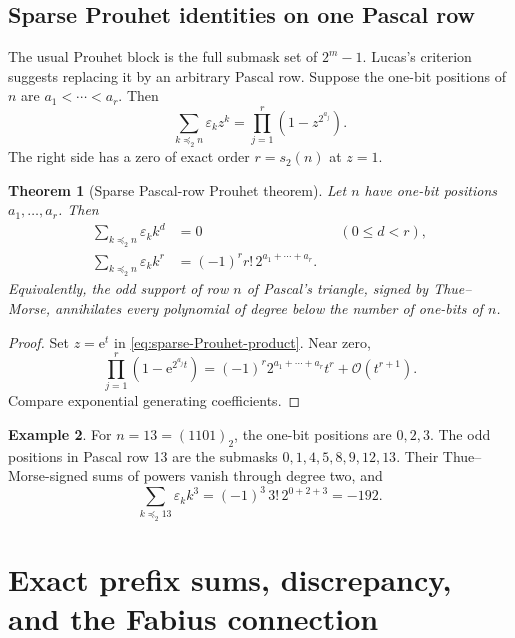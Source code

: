 \documentclass[11pt,oneside]{article}
\newtheorem{theorem}{Theorem}[section]
\theoremstyle{definition}
\newtheorem{example}[theorem]{Example}
\theoremstyle{remark}
\newcommand{\e}{\mathrm e}
\newcommand{\wt}{s_2}
\newcommand{\eps}{\varepsilon}
\newcommand{\submask}{\mathrel{\preccurlyeq_2}}
\newcommand{\bigO}{\mathcal O}
\begin{document}
\subsection{Sparse Prouhet identities on one Pascal row}

The usual Prouhet block is the full submask set of \(2^m-1\).  Lucas's criterion suggests
replacing it by an arbitrary Pascal row.  Suppose the one-bit positions of \(n\) are
\(a_1<\cdots<a_r\).  Then
\begin{equation}
  \sum_{k\submask n}\eps_kz^k
   =\prod_{j=1}^{r}(1-z^{2^{a_j}}).                         \label{eq:sparse-Prouhet-product}
\end{equation}
The right side has a zero of exact order \(r=\wt(n)\) at \(z=1\).

\begin{theorem}[Sparse Pascal-row Prouhet theorem]
\label{thm:sparse-Prouhet}
Let \(n\) have one-bit positions \(a_1,\ldots,a_r\).  Then
\begin{align}
  \sum_{k\submask n}\eps_kk^d&=0 &&(0\le d<r),             \label{eq:sparse-Prouhet-zero}\\
  \sum_{k\submask n}\eps_kk^r
    &=(-1)^r r!\,2^{a_1+\cdots+a_r}.                       \label{eq:sparse-Prouhet-boundary}
\end{align}
Equivalently, the odd support of row \(n\) of Pascal's triangle, signed by Thue--Morse,
annihilates every polynomial of degree below the number of one-bits of \(n\).
\end{theorem}

\begin{proof}
Set \(z=\e^t\) in \eqref{eq:sparse-Prouhet-product}.  Near zero,
\[
  \prod_{j=1}^r(1-\e^{2^{a_j}t})
   =(-1)^r2^{a_1+\cdots+a_r}t^r+\bigO(t^{r+1}).
\]
Compare exponential generating coefficients.
\end{proof}

\begin{example}
For \(n=13=(1101)_2\), the one-bit positions are \(0,2,3\).  The odd positions in Pascal
row 13 are the submasks
\(0,1,4,5,8,9,12,13\).  Their Thue--Morse-signed sums of powers vanish through degree two,
and
\[
  \sum_{k\submask13}\eps_kk^3=(-1)^3\,3!\,2^{0+2+3}=-192.
\]
\end{example}

\section{Exact prefix sums, discrepancy, and the Fabius connection}
\label{sec:prefix}
\end{document}
